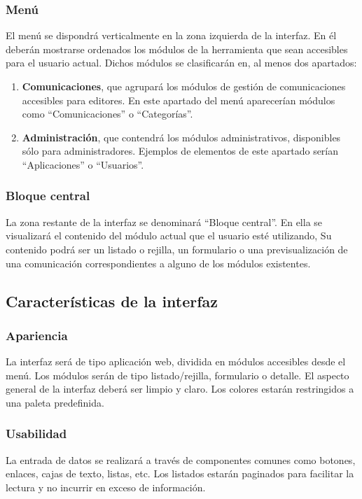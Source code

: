 \subsubsection*{Menú}
El menú se dispondrá verticalmente en la zona izquierda de la interfaz. En él deberán mostrarse ordenados los módulos de la herramienta que sean accesibles para el usuario actual. Dichos módulos se clasificarán en, al menos dos apartados: 

\begin{enumerate}
  \item \textbf{Comunicaciones}, que agrupará los módulos de gestión de comunicaciones accesibles para editores. En este apartado del menú aparecerían módulos como ``Comunicaciones'' o ``Categorías''.
  \item \textbf{Administración}, que contendrá los módulos administrativos, disponibles sólo para administradores. Ejemplos de elementos de este apartado serían ``Aplicaciones'' o ``Usuarios''.
\end{enumerate}

\subsubsection*{Bloque central}
La zona restante de la interfaz se denominará ``Bloque central''. En ella se visualizará el contenido del módulo actual que el usuario esté utilizando, Su contenido podrá ser un listado o rejilla, un formulario o una previsualización de una comunicación correspondientes a alguno de los módulos existentes.

\subsection{Características de la interfaz}
\subsubsection*{Apariencia}
La interfaz será de tipo aplicación web, dividida en módulos accesibles desde el menú. Los módulos serán de tipo listado/rejilla, formulario o detalle. El aspecto general de la interfaz deberá ser limpio y claro. Los colores estarán restringidos a una paleta predefinida.
\subsubsection*{Usabilidad}
La entrada de datos se realizará a través de componentes comunes como botones, enlaces, cajas de texto, listas, etc. Los listados estarán paginados para facilitar la lectura y no incurrir en exceso de información.
